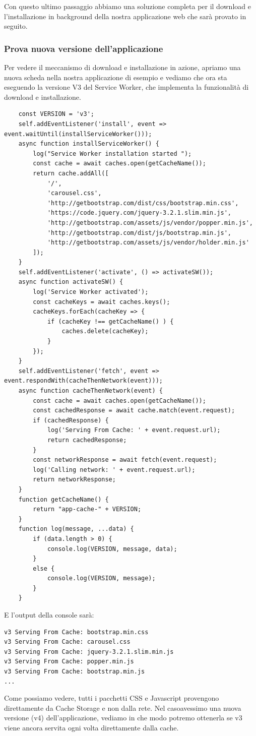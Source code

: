 \documentclass[italian]{article}
\begin{document}
Con questo ultimo passaggio abbiamo una soluzione completa per il download e l'installazione in background della nostra applicazione web che sarà provato in seguito.
\subsubsection{Prova nuova versione dell'applicazione}
Per vedere il meccanismo di download e installazione in azione, apriamo una nuova scheda nella nostra applicazione di esempio e vediamo che ora sta eseguendo la versione V3 del Service Worker, che implementa la funzionalità di download e installazione.
\begin{lstlisting}
	const VERSION = 'v3';
	self.addEventListener('install', event => event.waitUntil(installServiceWorker()));
	async function installServiceWorker() {
		log("Service Worker installation started ");
		const cache = await caches.open(getCacheName());
		return cache.addAll([
			'/',
			'carousel.css',
			'http://getbootstrap.com/dist/css/bootstrap.min.css',
			'https://code.jquery.com/jquery-3.2.1.slim.min.js',
			'http://getbootstrap.com/assets/js/vendor/popper.min.js',
			'http://getbootstrap.com/dist/js/bootstrap.min.js',
			'http://getbootstrap.com/assets/js/vendor/holder.min.js'
		]);
	}
	self.addEventListener('activate', () => activateSW());
	async function activateSW() {
		log('Service Worker activated');
		const cacheKeys = await caches.keys();
		cacheKeys.forEach(cacheKey => {
			if (cacheKey !== getCacheName() ) {
				caches.delete(cacheKey);
			}
		});
	}
	self.addEventListener('fetch', event => event.respondWith(cacheThenNetwork(event)));
	async function cacheThenNetwork(event) {
		const cache = await caches.open(getCacheName());
		const cachedResponse = await cache.match(event.request);
		if (cachedResponse) {
			log('Serving From Cache: ' + event.request.url);
			return cachedResponse;
		}	
		const networkResponse = await fetch(event.request);	
		log('Calling network: ' + event.request.url);	
		return networkResponse;	
	}	
	function getCacheName() {
		return "app-cache-" + VERSION;
	}
	function log(message, ...data) {
		if (data.length > 0) {
			console.log(VERSION, message, data);
		}
		else {
			console.log(VERSION, message);
		}
	}
\end{lstlisting}
\pagebreak
E l'output della console sarà:
\begin{lstlisting}
v3 Serving From Cache: bootstrap.min.css
v3 Serving From Cache: carousel.css
v3 Serving From Cache: jquery-3.2.1.slim.min.js
v3 Serving From Cache: popper.min.js
v3 Serving From Cache: bootstrap.min.js
...
\end{lstlisting}
Come possiamo vedere, tutti i pacchetti CSS e Javascript provengono direttamente da Cache Storage e non dalla rete. Nel casoavessimo una nuova versione (v4) dell'applicazione, vediamo in che modo potremo ottenerla se v3 viene ancora servita ogni volta direttamente dalla cache.
\end{document}
